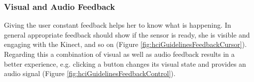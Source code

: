 \subsubsection{Visual and Audio Feedback}
Giving the user constant feedback helps her to know what is happening. In general appropriate feedback should show if the sensor is ready, she is visible and engaging with the Kinect, and so on (Figure \ref{fig:hciGuidelinesFeedbackCursor}). Regarding this a combination of visual as well as audio feedback results in a better experience, e.g. clicking a button changes its visual state and provides an audio signal (Figure \ref{fig:hciGuidelinesFeedbackControl}).

